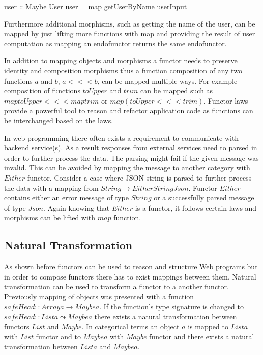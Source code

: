 \documentclass[article]{aaltoseries}
\begin{document}
    user :: Maybe User
    user = map getUserByName userInput

    Furthermore additional morphisms, such as getting the name of the user, can
    be mapped by just lifting more functions with map and providing the result
    of user computation as mapping an endofunctor returns the same endofunctor.
 
    In addition to mapping objects and morphisms a functor needs to preserve
    identity and composition morphisms thus a function composition of any two
    functions $a$ and $b$, $a <<< b$, can be mapped multiple ways. For example
    composition of functions $toUpper$ and $trim$ can be mapped such as $map toUpper <<<
    map trim$ or $map (toUpper <<< trim)$. Functor laws provide a powerful tool to
    reason and refactor application code as functions can be interchanged based on the
    laws.

    In web programming there often exists a requirement to communicate with backend
    service(s). As a result responses from external services need to parsed in order
    to further process the data. The parsing might fail if the given message was
    invalid. This can be avoided by mapping the message to another category with
    $Either$ functor. Consider a case where JSON string is parsed to further process
    the data with a mapping from $String \rightarrow Either String Json$. Functor $Either$
    contains either an error message of type $String$ or a successfully parsed message
    of type $Json$. Again knowing that $Either$ is a functor, it follows certain laws
    and morphisms can be lifted with $map$ function.



  \subsection{Natural Transformation}
    As shown before functors can be used to reason and structure Web programs
    but in order to compose functors there has to exist mappings between them.
    Natural transformation can be used to transform a functor to a another
    functor. Previously mapping of objects was presented with a function
    $safeHead :: Array a \rightarrow Maybe a$. If the function’s type signature is changed
    to $safeHead :: List a \leadsto Maybe a$ there exists a natural transformation
    between functors $List$ and $Maybe$. In categorical terms an object $a$ is mapped
    to $List a$ with $List$ functor and to $Maybe a$ with $Maybe$ functor and there
    exists a natural transformation between $List a$ and $Maybe a$.
\end{document}
